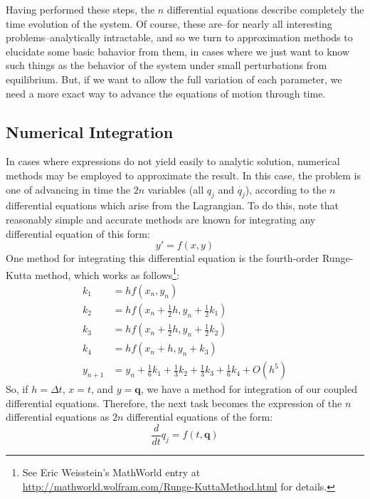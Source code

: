 \documentclass{article}
\renewcommand\vec\mathbf
\newcommand{\ddt}{\frac{d}{dt}}
\begin{document}
Having performed these steps, the $n$ differential equations describe completely the time evolution of the system. Of course, these are--for nearly all interesting problems--analytically intractable, and so we turn to approximation methods to elucidate some basic bahavior from them, in cases where we just want to know such things as the behavior of the system under small perturbations from equilibrium. But, if we want to allow the full variation of each parameter, we need a more exact way to advance the equations of motion through time.

\subsection{Numerical Integration}
In cases where expressions do not yield easily to analytic solution, numerical methods may be employed to approximate the result. In this case, the problem is one of advancing in time the $2n$ variables (all $q_{j}$ and $\dot{q_{j}}$), according to the $n$ differential equations which arise from the Lagrangian. To do this, note that reasonably simple and accurate methods are known for integrating any differential equation of this form:
\begin{equation}
 y' = f(x,y)
\end{equation}
One method for integrating this differential equation is the fourth-order Runge-Kutta method, which works as follows\footnote{See Eric Weisstein's MathWorld entry at \url{http://mathworld.wolfram.com/Runge-KuttaMethod.html} for details.}:
\begin{align}
 k_{1} &= hf(x_{n},y_{n}) \\
 k_{2} &= hf(x_{n}+\frac{1}{2}h, y_{n}+\frac{1}{2}k_{1}) \\
 k_{3} &= hf(x_{n}+\frac{1}{2}h, y_{n}+\frac{1}{2}k_{2}) \\ 
 k_{4} &= hf(x_{n}+h, y_{n}+k_{3}) \\
 y_{n+1} &= y_{n} + \frac{1}{6}k_{1} + \frac{1}{3}k_{2} + \frac{1}{3}k_{3}+\frac{1}{6}k_{4} + O(h^{5})
\end{align}
So, if $h=\Delta t$, $x=t$, and $y=\vec{q}$, we have a method for integration of our coupled differential equations. Therefore, the next task becomes the expression of the $n$ differential equations as $2n$ differential equations of the form:
\begin{equation}
 \ddt q_{j} = f(t, \vec{q})
\end{equation}
\end{document}
